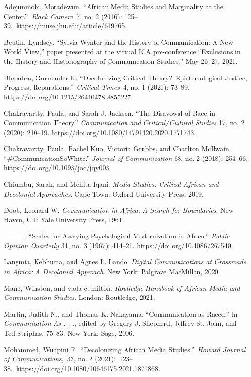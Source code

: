 \documentclass{tufte-handout}
\begin{document}
\begin{hangparas}{.25in}{1} 


Adejunmobi, Moradewun. ``African Media Studies and Marginality at the
Center.''~\emph{Black Camera}~7, no. 2 (2016):
125--39.~\url{https://muse.jhu.edu/article/619765}.

Beutin, Lyndsey. ``Sylvia Wynter and the History of Communication: A New
World View,'' paper presented at the virtual ICA pre-conference
``Exclusions in the History and Historiography of Communication
Studies,'' May 26--27, 2021.

Bhambra, Gurminder K. ``Decolonizing Critical Theory?~Epistemological
Justice, Progress, Reparations.''~\emph{Critical Times}~4, no. 1 (2021):
73--89. \url{https://doi.org/10.1215/26410478-8855227}.

Chakravartty, Paula, and Sarah J. Jackson. ``The Disavowal of Race in
Communication Theory.'' \emph{Communication and Critical/Cultural
Studies} 17, no. 2 (2020): 210--19.
\url{https://doi.org/10.1080/14791420.2020.1771743}.

Chakravartty, Paula, Rachel Kuo, Victoria Grubbs, and Charlton McIlwain.
``\#CommunicationSoWhite.'' \emph{Journal of Communication} 68, no. 2
(2018): 254--66. \url{https://doi.org/10.1093/joc/jqy003}.

Chiumbu, Sarah, and Mehita Iqani. \emph{Media Studies: Critical African
and Decolonial Approaches}. Cape Town: Oxford University Press, 2019.

Doob, Leonard W. \emph{Communication in Africa: A Search for
Boundaries}. New Haven, CT: Yale University Press, 1961.

---------. ``Scales for Assaying Psychological Modernization in
Africa.'' \emph{Public Opinion Quarterly} 31, no. 3 (1967): 414--21.
\url{https://doi.org/10.1086/267540}.

Langmia, Kebhuma, and Agnes L. Lando. \emph{Digital Communications at
Crossroads in Africa: A Decolonial Approach}. New York: Palgrave
MacMillan, 2020.

Mano, Winston, and viola c. milton. \emph{Routledge Handbook of African
Media and Communication Studies}. London: Routledge, 2021.

Martin, Judith N., and Thomas K. Nakayama. ``Communication as Raced.''
In \emph{Communication As . . .}, edited by Gregory J. Shepherd, Jeffrey
St. John, and Ted Striphas, 75--83. New York: Sage, 2006.

Mohammed, Wunpini F.~``Decolonizing African Media
Studies.''~\emph{Howard Journal of Communications},~32, no. 2
(2021):~123--38.~\url{https://doi.org/10.1080/10646175.2021.1871868}.


\end{hangparas}
\end{document}
